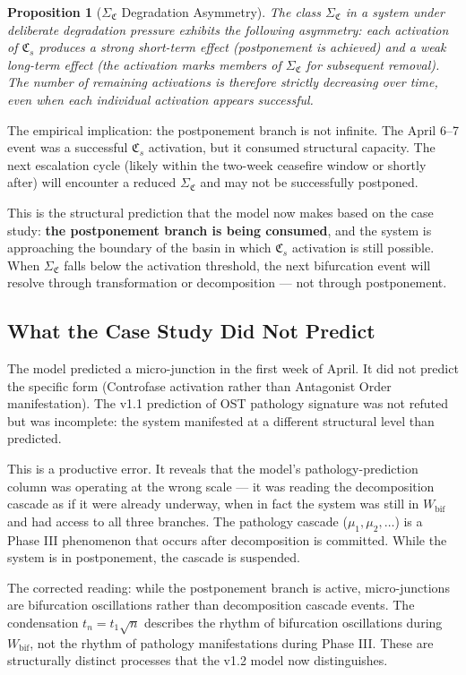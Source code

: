 \documentclass[12pt,a4paper]{article}
\newtheorem{proposition}{Proposition}[section]
\newcommand{\CFs}{\mathfrak{C}_s}        %
\newcommand{\SigmaCF}{\Sigma_{\mathfrak{C}}}  %
\begin{document}
\begin{proposition}[$\SigmaCF$ Degradation Asymmetry]\label{prop:sigmac_asymmetry}
The class $\SigmaCF$ in a system under deliberate degradation pressure exhibits the following asymmetry: each activation of $\CFs$ produces a strong short-term effect (postponement is achieved) and a weak long-term effect (the activation marks members of $\SigmaCF$ for subsequent removal). The number of remaining activations is therefore strictly decreasing over time, even when each individual activation appears successful.
\end{proposition}

The empirical implication: the postponement branch is not infinite. The April 6--7 event was a successful $\CFs$ activation, but it consumed structural capacity. The next escalation cycle (likely within the two-week ceasefire window or shortly after) will encounter a reduced $\SigmaCF$ and may not be successfully postponed.

This is the structural prediction that the model now makes based on the case study: \textbf{the postponement branch is being consumed}, and the system is approaching the boundary of the basin in which $\CFs$ activation is still possible. When $\SigmaCF$ falls below the activation threshold, the next bifurcation event will resolve through transformation or decomposition --- not through postponement.

\subsection{What the Case Study Did Not Predict}

The model predicted a micro-junction in the first week of April. It did not predict the specific form (Controfase activation rather than Antagonist Order manifestation). The v1.1 prediction of OST pathology signature was not refuted but was incomplete: the system manifested at a different structural level than predicted.

This is a productive error. It reveals that the model's pathology-prediction column was operating at the wrong scale --- it was reading the decomposition cascade as if it were already underway, when in fact the system was still in $W_{\mathrm{bif}}$ and had access to all three branches. The pathology cascade ($\mu_1, \mu_2, \ldots$) is a Phase III phenomenon that occurs after decomposition is committed. While the system is in postponement, the cascade is suspended.

The corrected reading: while the postponement branch is active, micro-junctions are bifurcation oscillations rather than decomposition cascade events. The condensation $t_n = t_1\sqrt{n}$ describes the rhythm of bifurcation oscillations during $W_{\mathrm{bif}}$, not the rhythm of pathology manifestations during Phase III. These are structurally distinct processes that the v1.2 model now distinguishes.
\end{document}
